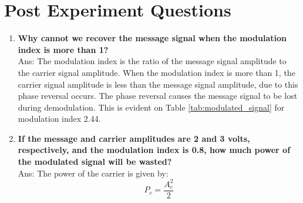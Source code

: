 \section*{Post Experiment Questions}

\begin{enumerate}
    \item \textbf{Why cannot we recover the message signal when the modulation index is more than 1?}\\
    Ans: The modulation index is the ratio of the message signal amplitude to the carrier signal amplitude. When the modulation index is more than 1, the carrier signal amplitude is less than the message signal amplitude, due to this phase reversal occurs. The phase reversal causes the message signal to be lost during demodulation. This is evident on Table \ref{tab:modulated_signal} for modulation index 2.44.\\
    \item \textbf{If the message and carrier amplitudes are 2 and 3 volts, respectively, and the modulation index is 0.8, how much power of the modulated signal will be wasted?}\\
    Ans: The power of the carrier is given by: 
    \begin{equation}
        P_c = \frac{A_c^2}{2}  
    \end{equation}


\end{enumerate}
